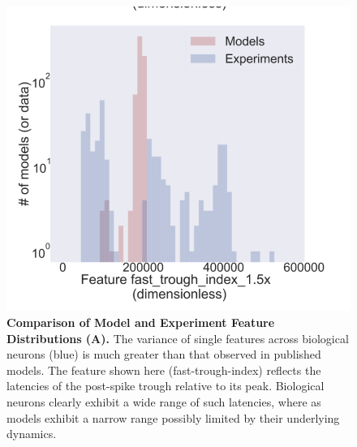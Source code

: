 \begin{figure}
    \centering
    \includegraphics[scale=0.5]{figures/fast_trough}
    \caption[Comparison of Model and Experiment Feature Distributions (A)]{\textbf{Comparison of Model and Experiment Feature Distributions (A).} The variance of single features across biological neurons (blue) is much greater than that observed in published models.
    The feature shown here (fast-trough-index) reflects the latencies of the post-spike trough relative to its peak.
    Biological neurons clearly exhibit a wide range of such latencies, where as models exhibit a narrow range possibly limited by their underlying dynamics.
    }
    \label{fig:from-poster-disagree}
\end{figure}

